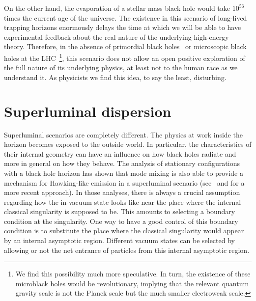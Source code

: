 \documentclass[12pt]{article}
\begin{document}
On the other hand, the evaporation of a stellar mass black hole would take $10^{56}$
times the current age of the universe. The existence in this scenario of long-lived
trapping horizons enormously delays the time at which we will be able to have
experimental feedback about the real nature of the underlying high-energy theory.
Therefore, in the absence of primordial black holes~\cite{Carr:2009jm} or
microscopic black holes at the LHC~\cite{Khachatryan:2010wx}\footnote{We find this
possibility much more speculative. In turn, the existence of these microblack holes
would be revolutionary, implying that the relevant quantum gravity scale is not the
Planck scale but the much smaller electroweak scale.}, this scenario does not allow
an open positive exploration of the full nature of its underlying physics, at least
not to the human race as we understand it. As physicists we find this idea, to say
the least, disturbing.

\section{Superluminal dispersion}
\label{Sec:Super}
    
Superluminal scenarios are completely different. 
The physics at work inside the horizon becomes exposed to the outside world.
In particular, the characteristics of their internal geometry can have 
an influence on how black holes radiate and more in general on how they behave.
The analysis of stationary configurations with a black hole horizon has shown that
mode mixing is also able to provide a mechanism for Hawking-like emission in a
superluminal scenario (see~\cite{Corley:1997pr} and \cite{macher-parentani} for a
more recent approach). In those analyses, there is always a crucial assumption
regarding how the in-vacuum state looks like near the place where the internal
classical singularity is supposed to be. This amounts to selecting a boundary
condition at the singularity. One way to have a good control of this boundary
condition is to substitute the place where the classical singularity would appear by
an internal asymptotic region. Different vacuum states can be selected by allowing
or not the net entrance of particles from this internal asymptotic region.  
\end{document}
